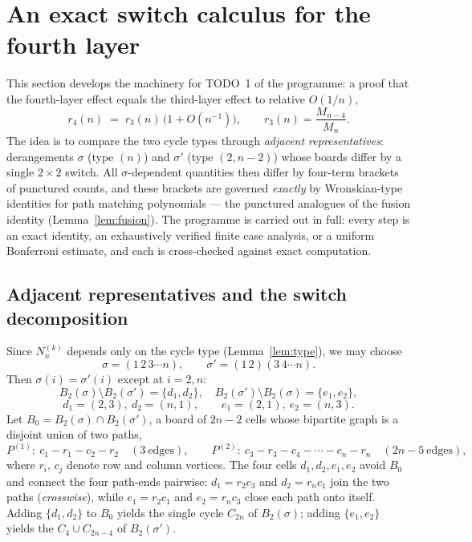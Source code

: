 \documentclass[11pt]{article}
\theoremstyle{definition}
\begin{document}
\section{An exact switch calculus for the fourth layer}\label{sec:switch}

This section develops the machinery for TODO~1 of the programme: a proof
that the fourth-layer effect equals the third-layer effect to relative
$O(1/n)$,
\begin{equation}\label{eq:r4thm}
r_4(n)\;=\;r_3(n)\,\bigl(1+O(n^{-1})\bigr),
\qquad r_3(n)=\frac{M_{n-4}}{M_n}.
\end{equation}
The idea is to compare the two cycle types through \emph{adjacent
representatives}: derangements $\sigma$ (type $(n)$) and $\sigma'$ (type
$(2,n-2)$) whose boards differ by a single $2\times2$ switch.  All
$\sigma$-dependent quantities then differ by four-term brackets of
punctured counts, and these brackets are governed \emph{exactly} by
Wronskian-type identities for path matching polynomials --- the punctured
analogues of the fusion identity (Lemma~\ref{lem:fusion}).  The programme is carried out in full: every step is an exact identity,
an exhaustively verified finite case analysis, or a uniform Bonferroni
estimate, and each is cross-checked against exact computation.

\subsection{Adjacent representatives and the switch decomposition}

Since $N^{(k)}_n$ depends only on the cycle type
(Lemma~\ref{lem:type}), we may choose
\[
\sigma=(1\,2\,3\cdots n),\qquad \sigma'=(1\,2)(3\,4\cdots n).
\]
Then $\sigma(i)=\sigma'(i)$ except at $i=2,n$:
\[
B_2(\sigma)\setminus B_2(\sigma')=\{d_1,d_2\},\quad
B_2(\sigma')\setminus B_2(\sigma)=\{e_1,e_2\},
\]
\[
d_1=(2,3),\ d_2=(n,1),\qquad e_1=(2,1),\ e_2=(n,3).
\]
Let $B_0=B_2(\sigma)\cap B_2(\sigma')$, a board of $2n-2$ cells whose
bipartite graph is a disjoint union of two paths,
\[
P^{(1)}:\ c_1-r_1-c_2-r_2\quad(3\ \text{edges}),\qquad
P^{(2)}:\ c_3-r_3-c_4-\cdots-c_n-r_n\quad(2n-5\ \text{edges}),
\]
where $r_i$, $c_j$ denote row and column vertices.  The four cells
$d_1,d_2,e_1,e_2$ avoid $B_0$ and connect the four path-ends pairwise:
$d_1=r_2c_3$ and $d_2=r_nc_1$ join the two paths (\emph{crosswise}),
while $e_1=r_2c_1$ and $e_2=r_nc_3$ close each path onto itself.
Adding $\{d_1,d_2\}$ to $B_0$ yields the single cycle $C_{2n}$ of
$B_2(\sigma)$; adding $\{e_1,e_2\}$ yields the $C_4\cup C_{2n-4}$ of
$B_2(\sigma')$.
\end{document}
